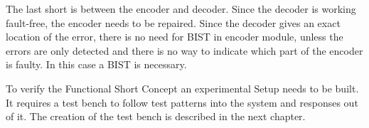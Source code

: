 The last short is between the encoder and decoder. Since the decoder is working fault-free, the encoder needs to be repaired. Since the decoder gives an exact location of the error, there is no need for BIST in encoder module, unless the errors are only detected and there is no way to indicate which part of the encoder is faulty. In this case a BIST is necessary.

To verify the Functional Short Concept an experimental Setup needs to be built. It requires a test bench to follow test patterns into the system and responses out of it. The creation of the test bench is described in the next chapter. 
